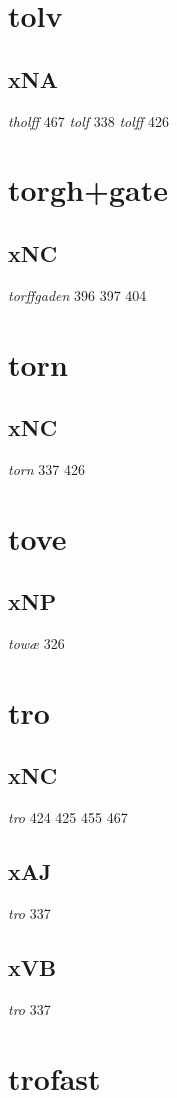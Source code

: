 \documentclass[a4paper,twocolumn]{article}
\begin{document}
\section{tolv}
\label{sec:org358beb4}
\subsection{xNA}
\label{sec:orgb8fc1d5}
\emph{tholff} 467 \emph{tolf} 338 \emph{tolff} 426 
\section{torgh+gate}
\label{sec:org83c83f8}
\subsection{xNC}
\label{sec:org1f95918}
\emph{torffgaden} 396 397 404 
\section{torn}
\label{sec:orge74b7e6}
\subsection{xNC}
\label{sec:orgcd6c507}
\emph{torn} 337 426 
\section{tove}
\label{sec:org70248f7}
\subsection{xNP}
\label{sec:org460058a}
\emph{towæ} 326 
\section{tro}
\label{sec:org1527371}
\subsection{xNC}
\label{sec:org267f6e2}
\emph{tro} 424 425 455 467 
\subsection{xAJ}
\label{sec:orgdcd72e7}
\emph{tro} 337 
\subsection{xVB}
\label{sec:orged6c60e}
\emph{tro} 337 
\section{trofast}
\label{sec:orgda2dedf}
\end{document}

